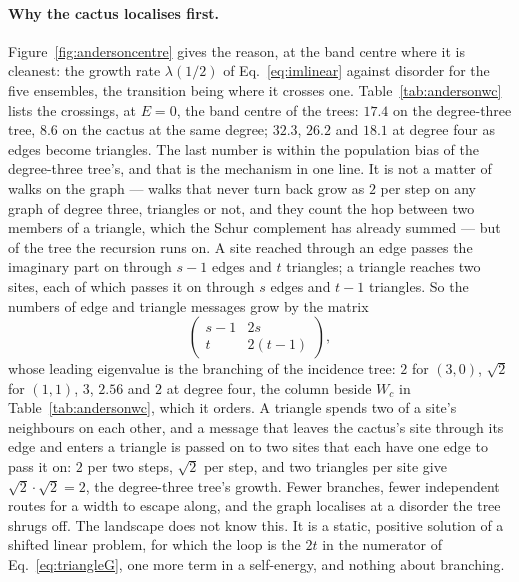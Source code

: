 \paragraph{Why the cactus localises first.} Figure~\ref{fig:andersoncentre}
gives the reason, at the band centre where it is cleanest: the growth rate
$\lambda(1/2)$ of Eq.~\eqref{eq:imlinear} against disorder for the five
ensembles, the transition being where it crosses one.
Table~\ref{tab:andersonwc} lists the crossings, at $E=0$, the band
centre of the trees: $17.4$ on the degree-three
tree, $8.6$ on the cactus at the same degree; $32.3$, $26.2$ and $18.1$ at
degree four as edges become triangles. The last number is within the
population bias of the degree-three tree's, and that is the mechanism in
one line. It is not a matter of walks on the graph --- walks that never
turn back grow as $2$ per step on any graph of degree three, triangles
or not, and they count the hop between two members of a triangle, which
the Schur complement has already summed --- but of the tree the
recursion runs on. A site reached through an edge passes the
imaginary part on through $s-1$ edges and $t$ triangles; a triangle
reaches two sites, each of which passes it on through $s$ edges and $t-1$
triangles. So the numbers of edge and triangle messages grow by the matrix
\begin{equation}
  \begin{pmatrix} s-1 & 2s\\ t & 2(t-1)\end{pmatrix},
  \label{eq:branchingloc}
\end{equation}
whose leading eigenvalue is the branching of the incidence tree:
$2$ for $(3,0)$, $\sqrt2$ for $(1,1)$, $3$, $2.56$ and $2$ at degree four,
the column beside $W_{c}$ in Table~\ref{tab:andersonwc}, which it orders.
A triangle spends two of a site's neighbours on each other, and a message
that leaves the cactus's site through its edge and enters a triangle is
passed on to two sites that each have one edge to pass it on: $2$ per two
steps, $\sqrt2$ per step, and two triangles per site give
$\sqrt2\cdot\sqrt2=2$, the degree-three tree's growth. Fewer branches,
fewer independent routes for a width to escape along, and the graph
localises at a disorder the tree shrugs off. The landscape does not know this. It is
a static, positive solution of a shifted linear problem, for which the
loop is the $2t$ in the numerator of Eq.~\eqref{eq:triangleG}, one more
term in a self-energy, and nothing about branching.

